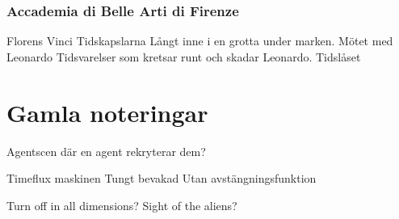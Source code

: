 \documentclass[a5paper,10pt]{report}
\begin{document}
\subsubsection{Accademia di Belle Arti di Firenze}


Florens
Vinci
Tidskapslarna
Långt inne i en grotta under marken.
Mötet med Leonardo
Tidsvarelser som kretsar runt och skadar Leonardo.
Tidslåset
\clearpage
\section{Gamla noteringar}

Agentscen där en agent rekryterar dem?

Timeflux maskinen
  Tungt bevakad
  Utan avstängningsfunktion

Turn off in all dimensions?
  Sight of the aliens?
\end{document}
